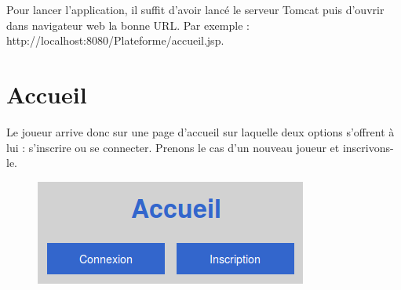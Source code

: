 
  Pour lancer l'application, il suffit d'avoir lancé le serveur Tomcat puis d'ouvrir dans navigateur web la bonne URL. Par exemple : http://localhost:8080/Plateforme/accueil.jsp.
    
  \section{Accueil}
  Le joueur arrive donc sur une page d'accueil sur laquelle deux options s'offrent à lui : s'inscrire ou se connecter. Prenons le cas d'un nouveau joueur et inscrivons-le.
  \begin{figure}[H]
    \center
    \includegraphics[scale=0.5]{../graph/1-accueil.png} 
  \end{figure}
    
